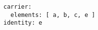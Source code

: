 \par\begin{minipage}{60ex}
\begin{verbatim}
carrier:
  elements: [ a, b, c, e ]
identity: e

\end{verbatim}
\end{minipage}\par